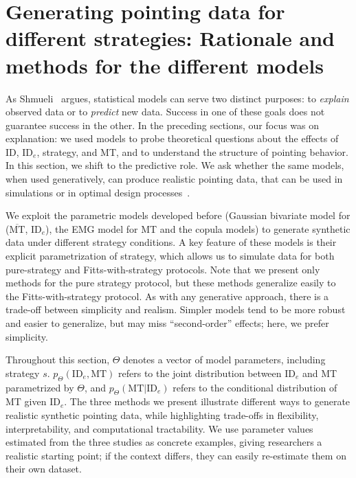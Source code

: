 \documentclass[acmlarge, manuscript,review]{acmart}
\newcommand{\mmt}{\ensuremath{\overline{\mt}}\xspace}
\newcommand{\mt}{\ensuremath{{\text{MT}}}\xspace}
\newcommand{\ide}{\ensuremath{{\text{ID}_e}}\xspace}
\begin{document}






\section{Generating pointing data for different strategies: Rationale and methods for the different models \label{sec:gen}}
As Shmueli~\cite{shmueli2010} argues, statistical models can serve two distinct purposes: to \textit{explain} observed data or to \textit{predict} new data. Success in one of these goals does not guarantee success in the other. In the preceding sections, our focus was on explanation: we used models to probe theoretical questions about the effects of ID, \ide, strategy, and MT, and to understand the structure of pointing behavior. In this section, we shift to the predictive role. We ask whether the same models, when used generatively, can produce realistic pointing data, that can be used \eg in simulations or in optimal design processes~\cite{oulasvirta2018,murray2022}.




We exploit the parametric models developed before (Gaussian bivariate model for (\mmt, \ide), the EMG model for MT and the copula models) to generate synthetic data under different strategy conditions. A key feature of these models is their explicit parametrization of strategy, which allows us to simulate data for both pure-strategy and Fitts-with-strategy protocols. Note that we present only methods for the pure strategy protocol, but these methods generalize easily to the Fitts-with-strategy protocol.
As with any generative approach, there is a trade-off between simplicity and realism. Simpler models tend to be more robust and easier to generalize, but may miss ``second-order'' effects; here, we prefer simplicity.


Throughout this section, $\Theta$ denotes a vector of model parameters, including strategy $s$. $p_{\Theta}(\ide, \mt)$ refers to the joint distribution between \ide and MT parametrized by $\Theta$, and $p_{\Theta}(\mt|\ide)$ refers to the conditional distribution of MT given \ide. The three methods we present illustrate different ways to generate realistic synthetic pointing data, while highlighting trade-offs in flexibility, interpretability, and computational tractability.
We use parameter values estimated from the three studies as concrete examples, giving researchers a realistic starting point; if the context differs, they can easily re-estimate them on their own dataset.
\end{document}
